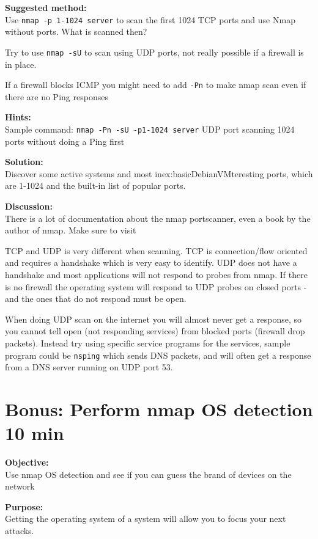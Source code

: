 \documentclass[a4paper,11pt,notitlepage]{report}
\begin{document}
{\bf Suggested method:}\\
Use \verb+nmap -p 1-1024 server+ to scan the first 1024 TCP
ports and use Nmap without ports. What is scanned then?

Try to use \verb+nmap -sU+ to scan using UDP ports, not really possible if a firewall is in place.

If a firewall blocks ICMP you might need to add \verb+-Pn+ to make nmap scan even if there are no Ping responses

{\bf Hints:} \\
Sample command: \verb+nmap -Pn -sU -p1-1024 server+ UDP port scanning
1024 ports without doing a Ping first

{\bf Solution:}\\
Discover some active systems and most in{ex:basicDebianVM}teresting ports, which are 1-1024 and the built-in list of popular ports.

{\bf Discussion:}\\
There is a lot of documentation about the nmap portscanner, even a book by the author
of nmap. Make sure to visit 

TCP and UDP is very different when scanning. TCP is connection/flow oriented and requires a handshake which is very easy to identify. UDP does not have a handshake and most applications will not respond to probes from nmap. If there is no firewall the operating system will respond to UDP probes on closed ports - and the ones that do not respond must be open.

When doing UDP scan on the internet you will almost never get a response, so you cannot tell open (not responding services) from blocked ports (firewall drop packets). Instead try using specific service programs for the services, sample program could be \verb+nsping+ which sends DNS packets, and will often get a response from a DNS server running on UDP port 53.

\chapter{Bonus: Perform nmap OS detection 10 min}
\label{ex:nmap-os}

{\bf Objective:} \\
Use nmap OS detection and see if you can guess the brand of devices on the network

{\bf Purpose:}\\
Getting the operating system of a system will allow you to focus your next attacks.
\end{document}
